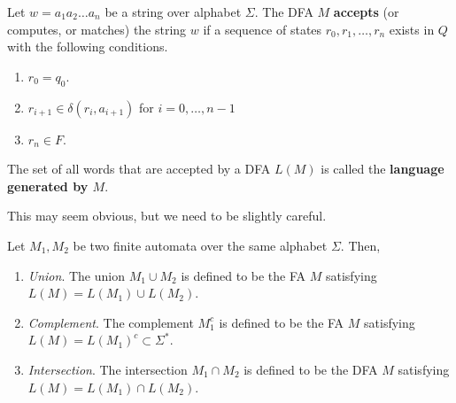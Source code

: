   \begin{definition}
    Let $w = a_1 a_2 \ldots a_n$ be a string over alphabet $\Sigma$. The DFA $M$ \textbf{accepts} (or computes, or matches) the string $w$ if a sequence of states $r_0, r_1, \ldots, r_n$ exists in $Q$ with the following conditions. 
    \begin{enumerate}
      \item $r_0 = q_0$. 
      \item $r_{i+1} \in \delta(r_i, a_{i+1})$ for $i = 0, \ldots, n-1$ 
      \item $r_n \in F$. 
    \end{enumerate}
    The set of all words that are accepted by a DFA $L(M)$ is called the \textbf{language generated by $M$}. 
  \end{definition}

  \begin{algo}
    This may seem obvious, but we need to be slightly careful. 
  \end{algo}

  \begin{definition}
    Let $M_1, M_2$ be two finite automata over the same alphabet $\Sigma$. Then, 
    \begin{enumerate}
      \item \textit{Union}. The union $M_1 \cup M_2$ is defined to be the FA $M$ satisfying $L(M) = L(M_1) \cup L(M_2)$. 
      \item \textit{Complement}. The complement $M_1^c$ is defined to be the FA $M$ satisfying $L(M) = L(M_1)^c \subset \Sigma^\ast$. 
      \item \textit{Intersection}. The intersection $M_1 \cap M_2$ is defined to be the DFA $M$ satisfying $L(M) = L(M_1) \cap L(M_2)$. 
    \end{enumerate}
  \end{definition}

